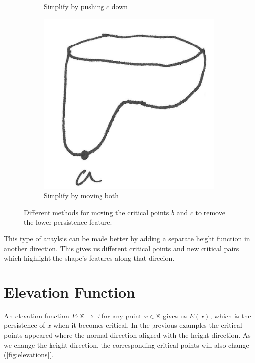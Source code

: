 \documentclass{article}
\begin{document}
\begin{figure}
\begin{subfigure}{0.24\columnwidth}
		\caption{Simplify by pushing $c$ down}
	\end{subfigure}
	\begin{subfigure}{0.24\columnwidth}
		\centering
		\includegraphics[width=\textwidth]{fig/blobby-torus-bottom-reduced3}
		\caption{Simplify by moving both}
	\end{subfigure}
	\caption{\label{fig:simplification} Different methods for moving the critical points $b$ and $c$
	to remove the lower-persistence feature.}
\end{figure}

This type of anaylsis can be made better by adding a separate height function in another direction. This gives us different critical points and new critical pairs which highlight the shape's features along that direcion.

\section{Elevation Function}

An elevation function $E:\mathbb{X}\to\mathbb{R}$ for any point $x\in\mathbb{X}$ gives us $E(x)$, which is the persistence of $x$ when it becomes critical. In the previous examples the critical points appeared where the normal direction aligned with the height direction. As we change the height direction, the corresponding
critical points will also change (\cref{fig:elevations}).
\end{document}
